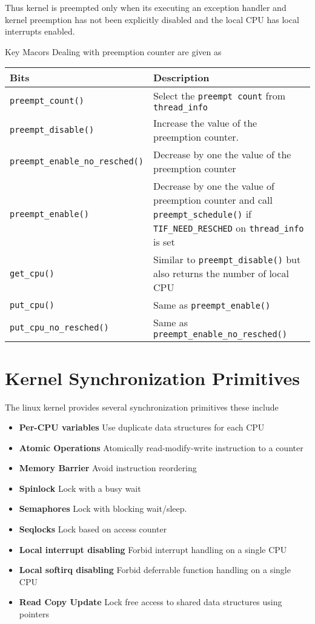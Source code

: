 \documentclass{article}
\begin{document}
Thus kernel is preempted only when its executing an exception handler
and kernel preemption has not been explicitly disabled and the local
CPU has local interrupts enabled.

Key Macors Dealing with preemption counter are given as 

\begin{center}
  \begin{tabular}{| l | p{9 cm} |}    
    \hline
    Bits & Description                    \\ \hline
    \lstinline{preempt_count()} & Select the \lstinline{preempt count} from \lstinline{thread_info}    \\ 
    \lstinline{preempt_disable()} & Increase the value of the preemption counter.     \\ 
    \lstinline{preempt_enable_no_resched()} &  Decrease by one the value of the preemption counter  \\
    \lstinline{preempt_enable()} & Decrease by one the value of preemption counter and call \lstinline{preempt_schedule()} if \lstinline{TIF_NEED_RESCHED} on \lstinline{thread_info} is set \\
    \lstinline{get_cpu()} & Similar to \lstinline{preempt_disable()} but also returns the number of local CPU \\
    \lstinline{put_cpu()} & Same as  \lstinline{preempt_enable()} \\
    \lstinline{put_cpu_no_resched()} & Same as \lstinline{preempt_enable_no_resched()}    \\
    \hline
  \end{tabular}
\end{center}


\section{Kernel Synchronization Primitives}

The linux kernel provides several synchronization primitives these
include

\begin{itemize}
\item \textbf{Per-CPU variables}
  Use duplicate data structures for each CPU
\item \textbf{Atomic Operations}
  Atomically read-modify-write instruction to a counter
\item \textbf{Memory Barrier}
  Avoid instruction reordering
\item  \textbf{Spinlock}
  Lock with a busy wait
\item \textbf{Semaphores}
  Lock with blocking wait/sleep.
\item \textbf{Seqlocks}
  Lock based on access counter
\item \textbf{Local interrupt disabling}
  Forbid interrupt handling on a single CPU
\item \textbf{Local softirq disabling}
  Forbid deferrable function handling on a single CPU
\item \textbf{Read Copy Update}
  Lock free access to shared data structures using pointers
\end{itemize}
\end{document}
